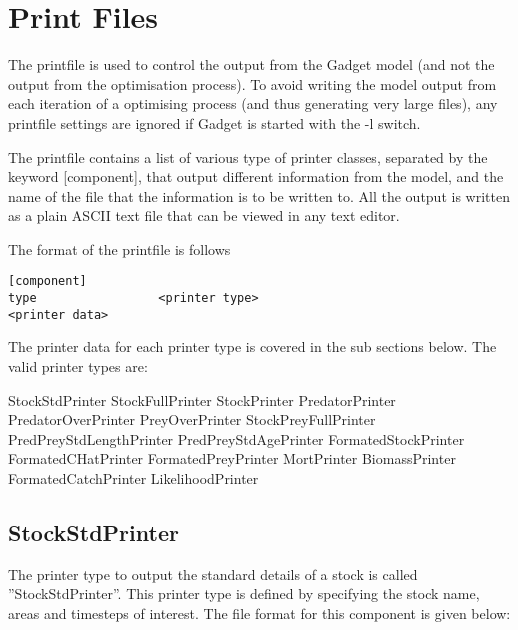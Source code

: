 \documentclass [a4paper, 10pt]{book}
\begin{document}
\chapter{Print Files}\label{chap:print}
The printfile is used to control the output from the Gadget model (and not the output from the optimisation process).  To avoid writing the model output from each iteration of a optimising process (and thus generating very large files), any printfile settings are ignored if Gadget is started with the -l switch.

\bigskip
The printfile contains a list of various type of printer classes, separated by the keyword [component], that output different information from the model, and the name of the file that the information is to be written to.  All the output is written as a plain ASCII text file that can be viewed in any text editor.

\bigskip
The format of the printfile is follows

\begin{verbatim}
[component]
type                 <printer type>
<printer data>
\end{verbatim}

The printer data for each printer type is covered in the sub sections below.  The valid printer types are:\newline

StockStdPrinter\newline
StockFullPrinter\newline
StockPrinter\newline
PredatorPrinter\newline
PredatorOverPrinter\newline
PreyOverPrinter\newline
StockPreyFullPrinter\newline
PredPreyStdLengthPrinter\newline
PredPreyStdAgePrinter\newline
FormatedStockPrinter\newline
FormatedCHatPrinter\newline
FormatedPreyPrinter\newline
MortPrinter\newline
BiomassPrinter\newline
FormatedCatchPrinter\newline
LikelihoodPrinter

\section{StockStdPrinter}\label{sec:stockstdprinter}
The printer type to output the standard details of a stock is called ''StockStdPrinter''.  This printer type is defined by specifying the stock name, areas and timesteps of interest.  The file format for this component is given below:
\end{document}
